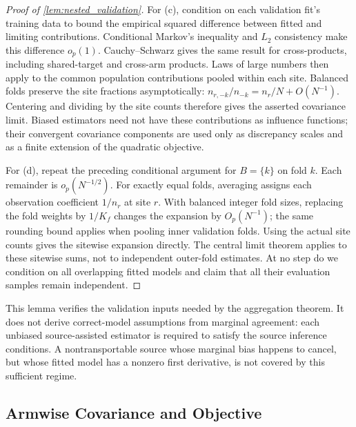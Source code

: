 \documentclass[12pt]{article}
\begin{document}
\begin{proof}[Proof of \cref{lem:nested_validation}]
For (c), condition on each validation fit's training data to bound the empirical squared difference between fitted and limiting contributions. Conditional Markov's inequality and $L_2$ consistency make this difference $o_p(1)$. Cauchy--Schwarz gives the same result for cross-products, including shared-target and cross-arm products. Laws of large numbers then apply to the common population contributions pooled within each site. Balanced folds preserve the site fractions asymptotically: $n_{r,-k}/n_{-k}=n_r/N+O(N^{-1})$. Centering and dividing by the site counts therefore gives the asserted covariance limit. Biased estimators need not have these contributions as influence functions; their convergent covariance components are used only as discrepancy scales and as a finite extension of the quadratic objective.

For (d), repeat the preceding conditional argument for $B=\{k\}$ on fold $k$. Each remainder is $o_p(N^{-1/2})$. For exactly equal folds, averaging assigns each observation coefficient $1/n_r$ at site $r$. With balanced integer fold sizes, replacing the fold weights by $1/K_f$ changes the expansion by $O_p(N^{-1})$; the same rounding bound applies when pooling inner validation folds. Using the actual site counts gives the sitewise expansion directly. The central limit theorem applies to these sitewise sums, not to independent outer-fold estimates. At no step do we condition on all overlapping fitted models and claim that all their evaluation samples remain independent.
\end{proof}

This lemma verifies the validation inputs needed by the aggregation theorem. It does not derive correct-model assumptions from marginal agreement: each unbiased source-assisted estimator is required to satisfy the source inference conditions. A nontransportable source whose marginal bias happens to cancel, but whose fitted model has a nonzero first derivative, is not covered by this sufficient regime.

\subsection{Armwise Covariance and Objective}\label{supp:aggregation_penalty}
\end{document}
